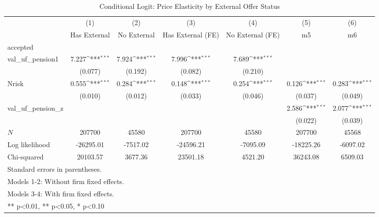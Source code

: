 \begin{table}[htbp]\centering
\def\sym#1{\ifmmode^{#1}\else\(^{#1}\)\fi}
\caption{Conditional Logit: Price Elasticity by External Offer Status}
\begin{tabular}{l*{6}{c}}
\hline\hline
            &\multicolumn{1}{c}{(1)}&\multicolumn{1}{c}{(2)}&\multicolumn{1}{c}{(3)}&\multicolumn{1}{c}{(4)}&\multicolumn{1}{c}{(5)}&\multicolumn{1}{c}{(6)}\\
            &\multicolumn{1}{c}{Has External}&\multicolumn{1}{c}{No External}&\multicolumn{1}{c}{Has External (FE)}&\multicolumn{1}{c}{No External (FE)}&\multicolumn{1}{c}{m5}&\multicolumn{1}{c}{m6}\\
\hline
accepted    &                     &                     &                     &                     &                     &                     \\
val\_uf\_pension1&       7.227\sym{***}&       7.924\sym{***}&       7.996\sym{***}&       7.689\sym{***}&                     &                     \\
            &     (0.077)         &     (0.192)         &     (0.082)         &     (0.210)         &                     &                     \\
[1em]
Nrisk       &       0.555\sym{***}&       0.284\sym{***}&       0.148\sym{***}&       0.254\sym{***}&       0.126\sym{***}&       0.283\sym{***}\\
            &     (0.010)         &     (0.012)         &     (0.033)         &     (0.046)         &     (0.037)         &     (0.049)         \\
[1em]
val\_uf\_pension\_z&                     &                     &                     &                     &       2.586\sym{***}&       2.077\sym{***}\\
            &                     &                     &                     &                     &     (0.022)         &     (0.039)         \\
\hline
\(N\)       &      207700         &       45580         &      207700         &       45580         &      207700         &       45568         \\
Log likelihood&   -26295.01         &    -7517.02         &   -24596.21         &    -7095.09         &   -18225.26         &    -6097.02         \\
Chi-squared &    20103.57         &     3677.36         &    23501.18         &     4521.20         &    36243.08         &     6509.03         \\
\hline\hline
\multicolumn{7}{l}{\footnotesize Standard errors in parentheses.}\\
\multicolumn{7}{l}{\footnotesize Models 1-2: Without firm fixed effects.}\\
\multicolumn{7}{l}{\footnotesize Models 3-4: With firm fixed effects.}\\
\multicolumn{7}{l}{\footnotesize *** p<0.01, ** p<0.05, * p<0.10}\\
\end{tabular}
\end{table}
